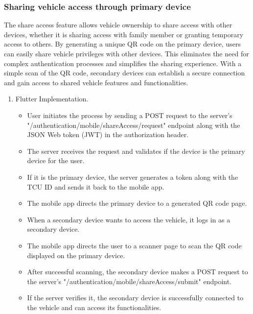 \documentclass[
12pt,
oneside, 
onehalfspacing, 
nolistspacing, 
parskip, 
chapterinoneline, 
]{AASTCOMPUTER}
\begin{document}
\subsubsection{Sharing vehicle access through primary device}
The share access feature allows vehicle ownership to share access with other devices, whether it is sharing access with family member or granting temporary access to others. By generating a unique QR code on the primary device, users can easily share vehicle privileges with other devices. This eliminates the need for complex authentication processes and simplifies the sharing experience. With a simple scan of the QR code, secondary devices can establish a secure connection and gain access to shared vehicle features and functionalities.
\begin{enumerate}
\item Flutter Implementation.
\begin{itemize}
\item User initiates the process by sending a POST request to the server's "/authentication/mobile/shareAccess/request" endpoint along with the JSON Web token (JWT) in the authorization header.
\item The server receives the request and validates if the device is the primary device for the user.
\item If it is the primary device, the server generates a token along with the TCU ID and sends it back to the mobile app.
\item The mobile app directs the primary device to a generated QR code page.
\item When a secondary device wants to access the vehicle, it logs in as a secondary device.
\item The mobile app directs the user to a scanner page to scan the QR code displayed on the primary device.
\item After successful scanning, the secondary device makes a POST request to the server's "/authentication/mobile/shareAccess/submit" endpoint.
\item If the server verifies it, the secondary device is successfully connected to the vehicle and can access its functionalities.
\end{itemize}
\end{enumerate}
\end{document}
